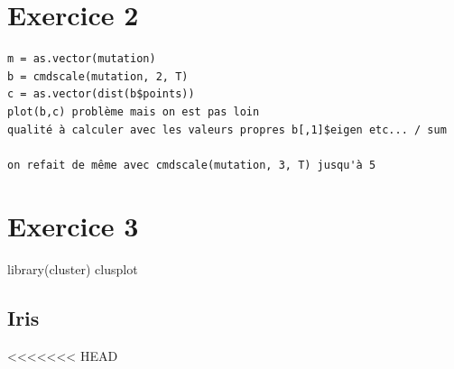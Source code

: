 \documentclass{article}\usepackage[]{graphicx}\usepackage[]{color}
\begin{document}
\section*{Exercice 2}

\begin{verbatim}
m = as.vector(mutation)
b = cmdscale(mutation, 2, T)
c = as.vector(dist(b$points))
plot(b,c) problème mais on est pas loin 
qualité à calculer avec les valeurs propres b[,1]$eigen etc... / sum 

on refait de même avec cmdscale(mutation, 3, T) jusqu'à 5 

\end{verbatim}

\section*{Exercice 3} 



library(cluster)
clusplot 
\subsection*{Iris}
<<<<<<< HEAD
\end{document}
